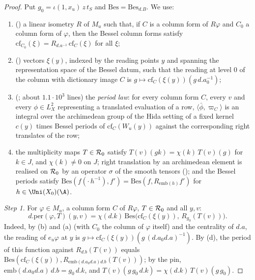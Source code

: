 \begin{proof}
Put $g_0=\iota(1,x_u)\,z\,t_S$ and $\mathrm{Bes}=\mathrm{Bes}_{d.B}$. We use:
\begin{enumerate}[label=(\alph*)]
\item () a linear isometry $R$ of $M_u$ such that, if
$C$ is a column form of $R\varphi$ and $C_0$ a column form of $\varphi$, then the Bessel column forms satisfy
$\mathrm{cf}_{C_0}(\xi)=R_{d.a^{-1}}\,\mathrm{cf}_C(\xi)$ for all $\xi$;
\item () vectors $\xi(y)$, indexed by the reading
points $y$ and spanning the representation space of the Bessel datum, such that the reading at level $0$ of the column with
dictionary image $C$ is $g\mapsto\mathrm{cf}_C(\xi(y))(g\,d.a_0^{-1})$;
\item (; about $1.1\cdot10^3$ lines) the
\emph{period law}: for every column form $C$, every $v$ and every $\phi\in L^2_X$ representing a translated evaluation of a
row, $\langle\bar\phi,\varpi_C\rangle$ is an integral over the archimedean group of the Hida setting of a fixed kernel $c(y)$
times Bessel periods of $\mathrm{cf}_C(W_u(y))$ against the corresponding right translates of the row;
\item the multiplicity maps $T\in\mathcal{R}_0$ satisfy $T(v)(gk)=\chi(k)\,T(v)(g)$ for $k\in J$, and $\chi(k)\ne0$ on $J$;
right translation by an archimedean element is realised on $\mathcal{R}_0$ by an operator $\sigma$ of the smooth tensors
(); and the Bessel periods satisfy
$\mathrm{Bes}(f(\cdot\,h^{-1}),f')=\mathrm{Bes}(f,R_{\mathrm{emb}(h)}f')$ for $h\in\Uni(X_0)(\A)$.
\end{enumerate}
\emph{Step 1.} For $\varphi\in M_u$, a column form $C$ of $R\varphi$, $T\in\mathcal{R}_0$ and all $y,v$:
\begin{equation}\label{pf:open0a:eq:L1}
d.\mathrm{per}(\varphi,T)(y,v)=\chi(d.k)\,\mathrm{Bes}\bigl(\mathrm{cf}_C(\xi(y)),\,R_{g_0}(T(v))\bigr).
\end{equation}
Indeed, by (b) and (a) (with $C_0$ the column of $\varphi$ itself) and the centrality of $d.a$, the reading of
$e_u\varphi$ at $y$ is $g\mapsto\mathrm{cf}_C(\xi(y))(g\,(d.a_0d.a)^{-1})$. By (d), the period of this function against
$R_{d.b}(T(v))$ equals $\mathrm{Bes}(\mathrm{cf}_C(\xi(y)),R_{\mathrm{emb}(d.a_0d.a)d.b}(T(v)))$; by the pin,
$\mathrm{emb}(d.a_0d.a)\,d.b=g_0\,d.k$, and $T(v)(g\,g_0\,d.k)=\chi(d.k)\,T(v)(g\,g_0)$.


\end{proof}
